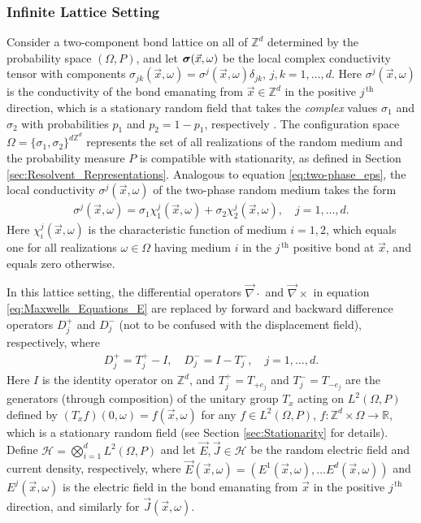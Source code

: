 \documentclass{cmslatex}
\newcommand\bsig{\mbox{\boldmath${\sigma}$}}
\begin{document}
\subsubsection{Infinite Lattice Setting}
\label{sec:Infinite_Lattice_Setting}
%
Consider a two-component bond lattice on all of $\mathbb{Z}^d$
determined by the probability space $(\Omega,P)$, and let
$\bsig(\vec{x},\omega)$ be the local complex conductivity tensor with
components $\sigma_{jk}(\vec{x},\omega)=\sigma^j(\vec{x},\omega)\delta_{jk}$, $j,k=1,\ldots,d$. Here
$\sigma^j(\vec{x},\omega)$ is the conductivity of the bond emanating from 
$\vec{x}\in\mathbb{Z}^d$ in the positive $j^{\,\text{th}}$ direction, 
which is a stationary random field that takes the \emph{complex} values
$\sigma_1$ and $\sigma_2$ with probabilities $p_1$ and $p_2=1-p_1$,
respectively \cite{Golden:CMP-467,Bruno:JSP-365}. The configuration
space $\Omega=\{\sigma_1,\sigma_2\}^{d\mathbb{Z}^d}$ represents the set of all
realizations of the random medium and the 
probability measure $P$ is compatible with stationarity, as defined in
Section \ref{sec:Resolvent_Representations}. Analogous to equation
\eqref{eq:two-phase_eps}, the local conductivity $\sigma^j(\vec{x},\omega)$ of
the two-phase random medium takes the form \cite{Golden:CMP-467}
%
\begin{align}\label{eq:two-phase_sigma}
  \sigma^j(\vec{x},\omega)=\sigma_1\chi_1^j(\vec{x},\omega)+\sigma_2\chi_2^j(\vec{x},\omega), \quad j=1,\ldots,d.
\end{align}
%
Here $\chi_i^j(\vec{x},\omega)$ is the characteristic function of medium
$i=1,2$, which equals one for all realizations $\omega\in\Omega$ having medium $i$
in the $j^{\,\text{th}}$ positive bond at $\vec{x}$, and equals zero
otherwise.




In this lattice setting, the differential operators $\vec{\nabla}\cdot$ and
$\vec{\nabla}\times$ in equation \eqref{eq:Maxwells_Equations_E} are replaced
\cite{Golden:CMP-467,Bruno:JSP-365} by forward and backward
difference operators $D_j^+$ and $D_j^-$ (not to be
confused with the displacement field), respectively, where
%
\begin{align}\label{eq:Difference_Operators}
  D_j^+=T_j^+-I, \quad D_j^-=I-T_j^-, \quad j=1,\ldots,d.
\end{align}
%
Here $I$ is the identity operator on $\mathbb{Z}^d$, and 
$T_j^+=T_{+e_j}$ and $T_j^-=T_{-e_j}$ are the generators (through 
composition) of the unitary group $T_x$ acting on $L^2(\Omega,P)$ defined
by $(T_xf)(0,\omega)=f(\vec{x},\omega)$ for any $f\in L^2(\Omega,P)$,
$f:\mathbb{Z}^d\times\Omega\to\mathbb{R}$, which is a stationary random field
\cite{Golden:CMP-467} (see Section \ref{sec:Stationarity} for
details). Define $\mathscr{H}=\bigotimes_{i=1}^dL^2(\Omega,P)$ and let
$\vec{E},\vec{J}\in \mathscr{H}$ be  
the random electric field and current density,
respectively, where $\vec{E}(\vec{x},\omega)=(E^1(\vec{x},\omega),\ldots
E^d(\vec{x},\omega))$ and $E^j(\vec{x},\omega)$ is the electric field in the
bond emanating from $\vec{x}$ in the positive $j^{\,\text{th}}$
direction, and similarly for $\vec{J}(\vec{x},\omega)$. 
\end{document}
